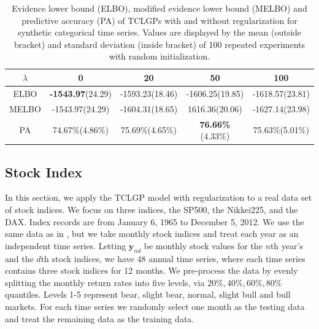 \documentclass{article}
\begin{document}
\begin{table}[ht!]
	\centering
	\begin{tabular}{|c|c|c|c|c|}
		\hline
		$\lambda$ & 0 & 20 & 50 & 100 \\
		\hline
		ELBO & \textbf{-1543.97}(24.29)  & -1593.23(18.46) & -1606.25(19.85) & -1618.57(23.81) \\
		\hline
		MELBO & -1543.97(24.29) & -1604.31(18.65) & 1616.36(20.06) & -1627.14(23.98) \\
		\hline
		PA & 74.67\%(4.86\%) & 75.69\%(4.65\%) & \textbf{76.66\%}(4.33\%) & 75.63\%(5.01\%)\\
		\hline
	\end{tabular}
	\caption{Evidence lower bound (ELBO), modified evidence lower bound (MELBO) and predictive accuracy (PA) of TCLGPs with and without regularization for synthetic categorical time series. Values are displayed by the mean (outside bracket) and standard deviation (inside bracket) of 100 repeated experiments with random initialization.}
	\label{tab:SIM}
\end{table}

\subsection{Stock Index}
In this section, we apply the TCLGP model with regularization to a real data set of stock indices.
We focus on three indices, the SP500, the Nikkei225, and the DAX. Index records are from January 6, 1965 to December 5, 2012. We use the same data as in \cite{Joao_2014}, but we take monthly stock indices and treat each year as an independent time series. Letting $\bm y_{nd}$ be monthly stock values for the $n$th year's and the $d$th stock indices, we have $48$ annual time series, where each time series contains three stock indices for 12 months. We pre-process the data by evenly splitting the monthly return rates into five levels, via $20\%, 40\%, 60\%, 80\%$ quantiles.
%
Levels 1-5 represent bear, slight bear, normal, slight bull and bull markets. For each time series we randomly select one month as the testing data and treat the remaining data as the training data.

\end{document}
